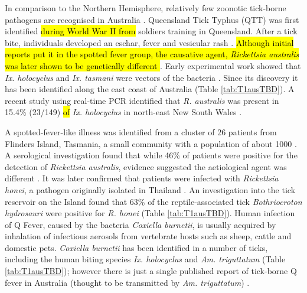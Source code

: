 \documentclass[a4paper, nobind]{templates/ociamthesis}
\begin{document}
In comparison to the Northern Hemisphere, relatively few zoonotic tick-borne pathogens are recognised in Australia \autocite{madison-antenucciEmergingTickBorneDiseases2020,rochlinEmergingTickbornePathogens2020}.
Queensland Tick Typhus (QTT) was first identified \hl{during World War II from} soldiers training in Queensland.
After a tick bite, individuals developed an eschar, fever and vesicular rash \autocite{andrewTickTyphusNorth1946}.
\hl{Although initial reports put it in the spotted fever group, the causative agent, \emph{Rickettsia australis} was later shown to be genetically different \autocite{stenosRickettsialOutermembraneProtein2000}}.
Early experimental work showed that \emph{Ix. holocyclus} and \emph{Ix. tasmani} were vectors of the bacteria \autocite{campbellRickettsiosesAustraliaIsolation1974}.
Since its discovery it has been identified along the east coast of Australia \autocite{campbellQueenslandTickTyphus1979,wilsonQueenslandTickTyphus2013,fergieQueenslandTickTyphus2017} (Table \ref{tab:T1ausTBD}).
A recent study using real-time PCR identified that \emph{R. australis} was present in 15.4\% (23/149) \hl{of} \emph{Ix. holocyclus} in north-east New South Wales \autocite{gravesIxodesHolocyclusTicktransmitted2016}.

A spotted-fever-like illness was identified from a cluster of 26 patients from Flinders Island, Tasmania, a small community with a population of about 1000 \autocite{stewartFlindersIslandSpotted1991}.
A serological investigation found that while 46\% of patients were positive for the detection of \emph{Rickettsia australis}, evidence suggested the aetiological agent was different \autocite{gravesSpottedFeverGroup1993}.
It was later confirmed that patients were infected with \emph{Rickettsia honei}, a pathogen originally isolated in Thailand \autocite{gravesRickettsiaHonei2003}.
An investigation into the tick reservoir on the Island found that 63\% of the reptile-associated tick \emph{Bothriocroton hydrosauri} were positive for \emph{R. honei} \autocite{stenosAponommaHydrosauriReptileassociated2003} (Table \ref{tab:T1ausTBD}).
Human infection of Q Fever, caused by the bacteria \emph{Coxiella burnetii}, is usually acquired by inhalation of infectious aerosols from vertebrate hosts such as sheep, cattle and domestic pets.
\emph{Coxiella burnetii} has been identified in a number of ticks, including the human biting species \emph{Ix. holocyclus} \autocite{gravesIxodesHolocyclusTicktransmitted2016} and \emph{Am. triguttatum} \autocite{popeCoxiellaBurnetiKangaroos1960,cooperSerologicalEvidenceCoxiella2012} (Table \ref{tab:T1ausTBD}); however there is just a single published report of tick-borne Q fever in Australia (thought to be transmitted by \emph{Am. triguttatum}) \autocite{beamanPericarditisAssociatedTickborne1989}.
\end{document}
